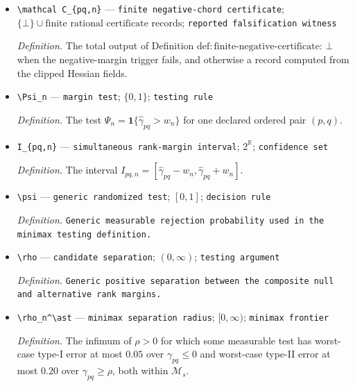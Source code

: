 \documentclass{article}
\begin{document}
\begin{itemize}
  \par\smallskip\noindent\emph{Definition.} A deterministic outward-rounded algorithm which, for a declared regime and rational box in \(\Omega\), returns entrywise rational intervals containing the range of \(\widehat H_p\) on that box; under repeated rational subdivision its excess interval diameter converges to zero.
  \item \texttt{\textbackslash{}\allowbreak{}mathcal C\_\allowbreak{}\{pq,\allowbreak{}n\}\allowbreak{}} --- \texttt{finite negative-\allowbreak{}chord certificate}; \(\{\bot\}\cup\text{finite rational certificate records}\); \texttt{reported falsification witness}
  \par\smallskip\noindent\emph{Definition.} The total output of Definition \(\mathrm{def:finite\text{-}negative\text{-}certificate}\): \(\bot\) when the negative-margin trigger fails, and otherwise a record computed from the clipped Hessian fields.
  \item \texttt{\textbackslash{}\allowbreak{}Psi\_\allowbreak{}n} --- \texttt{margin test}; \(\{0,1\}\); \texttt{testing rule}
  \par\smallskip\noindent\emph{Definition.} The test \(\Psi_n=\mathbf 1\{\widehat\gamma_{pq}>w_n\}\) for one declared ordered pair \((p,q)\).
  \item \texttt{I\_\allowbreak{}\{pq,\allowbreak{}n\}\allowbreak{}} --- \texttt{simultaneous rank-\allowbreak{}margin interval}; \(2^{\mathbb R}\); \texttt{confidence set}
  \par\smallskip\noindent\emph{Definition.} The interval \(I_{pq,n}=[\widehat\gamma_{pq}-w_n,\widehat\gamma_{pq}+w_n]\).
  \item \texttt{\textbackslash{}\allowbreak{}psi} --- \texttt{generic randomized test}; \([0,1]\); \texttt{decision rule}
  \par\smallskip\noindent\emph{Definition.} \texttt{Generic measurable rejection probability used in the minimax testing definition.}
  \item \texttt{\textbackslash{}\allowbreak{}rho} --- \texttt{candidate separation}; \((0,\infty)\); \texttt{testing argument}
  \par\smallskip\noindent\emph{Definition.} \texttt{Generic positive separation between the composite null and alternative rank margins.}
  \item \texttt{\textbackslash{}\allowbreak{}rho\_\allowbreak{}n\textasciicircum{}\textbackslash{}\allowbreak{}ast} --- \texttt{minimax separation radius}; \([0,\infty)\); \texttt{minimax frontier}
  \par\smallskip\noindent\emph{Definition.} The infimum of \(\rho>0\) for which some measurable test has worst-case type-I error at most \(0.05\) over \(\gamma_{pq}\le0\) and worst-case type-II error at most \(0.20\) over \(\gamma_{pq}\ge\rho\), both within \(\mathcal M_s\).

\end{itemize}
\end{document}
